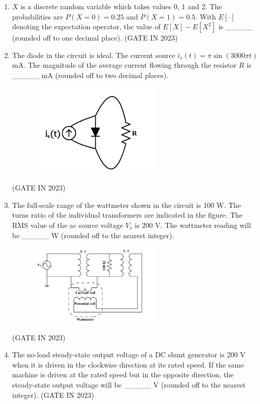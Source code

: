 \documentclass[journal]{IEEEtran}
\begin{document}
\begin{enumerate}
    \item $X$ is a discrete random variable which takes values 0, 1 and 2. The probabilities are $P(X = 0) = 0.25$ and $P(X = 1) = 0.5$. With $E[\cdot]$ denoting the expectation operator, the value of $E[X] - E[X^2]$ is \_\_\_\_\_ (rounded off to one decimal place).
\hfill(GATE IN 2023)

    \item The diode in the circuit is ideal. The current source $i_s(t) = \pi \sin (3000\pi t)$ mA. The magnitude of the average current flowing through the resistor $R$ is \_\_\_\_\_ mA (rounded off to two decimal places).
    \begin{figure}[H]
    \centering
      \includegraphics[width=0.6\textwidth]{18.png} 
      \caption{}
    \label{fig:fig18} 
\end{figure}
\hfill(GATE IN 2023)

    \item The full-scale range of the wattmeter shown in the circuit is 100 W. The turns ratio of the individual transformers are indicated in the figure. The RMS value of the ac source voltage $V_s$ is 200 V. The wattmeter reading will be \_\_\_\_\_ W (rounded off to the nearest integer).
    \begin{figure}[H]
    \centering
      \includegraphics[width=0.6\textwidth]{19.png} 
      \caption{}
    \label{fig:fig19} 
\end{figure}
\hfill(GATE IN 2023)

    \item The no-load steady-state output voltage of a DC shunt generator is 200 V when it is driven in the clockwise direction at its rated speed. If the same machine is driven at the rated speed but in the opposite direction, the steady-state output voltage will be \_\_\_\_\_ V (rounded off to the nearest integer).
\hfill(GATE IN 2023)


\end{enumerate}
\end{document}
